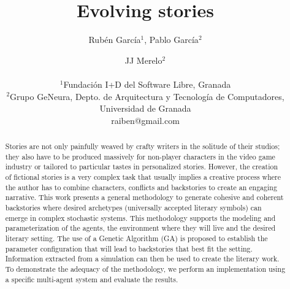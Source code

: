 \documentclass[letterpaper]{article}
\title{Evolving stories}
\author{Rub\'en Garc\'ia$^{1}$, Pablo Garc\'ia$^{2}$ \and JJ Merelo$^2$ \\
\mbox{}\\
$^1$Fundaci\'on I+D del Software Libre, Granada \\
$^2$Grupo GeNeura, Depto. de Arquitectura y Tecnología de Computadores, Universidad de Granada \\
raiben@gmail.com}
\begin{document}
\maketitle

\begin{abstract}


Stories are not only painfully weaved by crafty writers in the
solitude of their studios; they also have to be produced massively for
non-player characters in the video game industry or tailored to
particular tastes in personalized stories. However, the creation of
fictional stories is a very complex task that usually implies a
creative process where the author has to combine characters, 
conflicts and backstories to create an engaging narrative.
This work presents a general methodology to generate cohesive and coherent
backstories where desired archetypes (universally accepted literary symbols) can emerge in complex stochastic systems.
This methodology supports the modeling and parameterization of the agents, the environment where they will live and the desired literary setting. The use of a Genetic Algorithm (GA) is proposed to establish the parameter configuration that will lead to backstories that best fit the setting. Information extracted from a simulation can then be used to create the literary work.
To demonstrate the adequacy of the methodology, we perform an implementation using a specific multi-agent system and evaluate the results.
\end{abstract}
\end{document}
